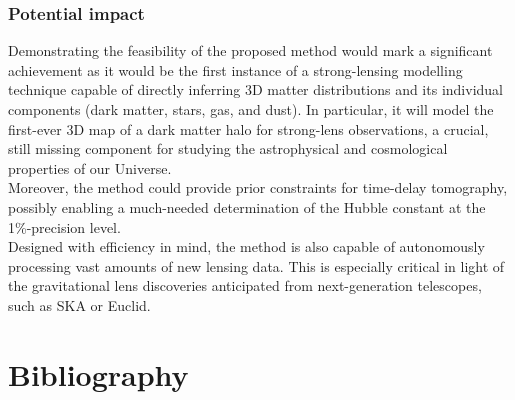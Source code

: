 \documentclass[a4paper,10pt]{article}
\begin{document}
\subsubsection{Potential impact}
\label{sec:orgba023a1}

Demonstrating the feasibility of the proposed method would mark a
significant achievement as it would be the first instance of a
strong-lensing modelling technique capable of directly inferring 3D
matter distributions and its individual components (dark matter,
stars, gas, and dust).  In particular, it will model the first-ever 3D
map of a dark matter halo for strong-lens observations, a crucial,
still missing component for studying the astrophysical and
cosmological properties of our Universe. \\[0pt]
Moreover, the method could provide prior constraints for time-delay
tomography, possibly enabling a much-needed determination of the
Hubble constant at the 1\%-precision level. \\[0pt]
Designed with efficiency in mind, the method is also capable of
autonomously processing vast amounts of new lensing data. This is
especially critical in light of the gravitational lens discoveries
anticipated from next-generation telescopes, such as SKA or Euclid.


\newpage
\section{Bibliography}
\label{sec:orge24f7dc}



\end{document}
